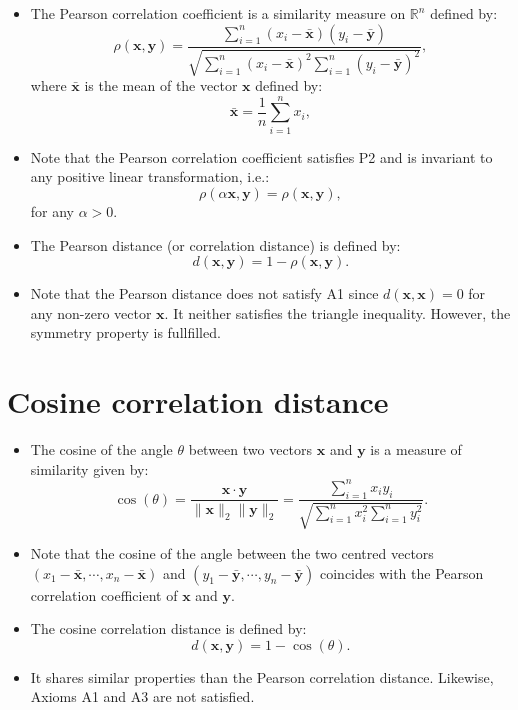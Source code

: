 \documentclass[
]{article}
\providecommand{\tightlist}{%
  \setlength{\itemsep}{0pt}\setlength{\parskip}{0pt}}
\begin{document}
\begin{itemize}
\item
  The Pearson correlation coefficient is a similarity measure on
  \(\mathbb{R}^n\) defined by: \[
  \rho(\mathbf{x},\mathbf{y})=
  \frac{\sum_{i=1}^n (x_i-\bar{\mathbf{x}})(y_i-\bar{\mathbf{y}})}{{\sqrt{\sum_{i=1}^n (x_i-\bar{\mathbf{x}})^2\sum_{i=1}^n (y_i-\bar{\mathbf{y}})^2}}},
  \] where \(\bar{\mathbf{x}}\) is the mean of the vector \(\mathbf{x}\)
  defined by: \[\bar{\mathbf{x}}=\frac{1}{n}\sum_{i=1}^n x_i,\]
\item
  Note that the Pearson correlation coefficient satisfies P2 and is
  invariant to any positive linear transformation, i.e.:
  \[\rho(\alpha\mathbf{x},\mathbf{y})=\rho(\mathbf{x},\mathbf{y}),\] for
  any \(\alpha>0\).
\item
  The Pearson distance (or correlation distance) is defined by: \[
  d(\mathbf{x},\mathbf{y})=1-\rho(\mathbf{x},\mathbf{y}).\]
\item
  Note that the Pearson distance does not satisfy A1 since
  \(d(\mathbf{x},\mathbf{x})=0\) for any non-zero vector \(\mathbf{x}\).
  It neither satisfies the triangle inequality. However, the symmetry
  property is fullfilled.
\end{itemize}

\hypertarget{cosine-correlation-distance}{%
\section{Cosine correlation
distance}\label{cosine-correlation-distance}}

\begin{itemize}
\tightlist
\item
  The cosine of the angle \(\theta\) between two vectors \(\mathbf{x}\)
  and \(\mathbf{y}\) is a measure of similarity given by: \[
  \cos(\theta)=\frac{\mathbf{x}\cdot \mathbf{y}}{\|\mathbf{x}\|_2\|\mathbf{y}\|_2}=\frac{\sum_{i=1}^n x_i y_i}{{\sqrt{\sum_{i=1}^n x_i^2\sum_{i=1}^n y_i^2}}}.
  \]
\item
  Note that the cosine of the angle between the two centred vectors
  \((x_1-\bar{\mathbf{x}},\cdots,x_n-\bar{\mathbf{x}})\) and
  \((y_1-\bar{\mathbf{y}},\cdots,y_n-\bar{\mathbf{y}})\) coincides with
  the Pearson correlation coefficient of \(\mathbf{x}\) and
  \(\mathbf{y}\).\\
\item
  The cosine correlation distance is defined by: \[
  d(\mathbf{x},\mathbf{y})=1-\cos(\theta).
  \]
\item
  It shares similar properties than the Pearson correlation distance.
  Likewise, Axioms A1 and A3 are not satisfied.
\end{itemize}
\end{document}
